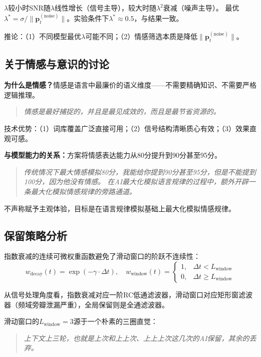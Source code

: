 \documentclass[a4paper, 11pt]{article}
\begin{document}
$\lambda$较小时SNR随$\lambda$线性增长（信号主导），较大时随$\lambda^2$衰减（噪声主导）。
最优$\lambda^* = \sigma / \|\bm{p}_t^{(\text{noise})}\|$。实验条件下$\lambda^* \approx 0.5$，与结果一致。

推论：（1）不同模型最优$\lambda$可能不同；（2）情感筛选本质是降低$\|\bm{p}_t^{(\text{noise})}\|$。

\subsection{关于情感与意识的讨论}

\textbf{为什么是情感？}情感是语言中最廉价的语义维度——不需要精确知识、不需要严格逻辑推理。
\begin{quote}\small\itshape
情感是最好捕捉的，并且是最见成效的，而且是最节省资源的。
\end{quote}
技术优势：（1）词库覆盖广泛直接可用；（2）信号结构清晰质心有效；（3）效果直观可感。

\textbf{与模型能力的关系：}方案将情感表达能力从80分提升到90分甚至95分。
\begin{quote}\small\itshape
传统情况下最大情感模拟80分，我能给你提到90分甚至95分，但是不能提到100分，因为他没有情感。
在AI最大化模拟语言规律的过程中，额外开辟一条最大化模拟情感规律的旁路通道。
\end{quote}
不声称赋予主观体验，目标是在语言规律模拟基础上最大化模拟情感规律。

\subsection{保留策略分析}

指数衰减的连续可微权重函数避免了滑动窗口的阶跃不连续性：
\begin{equation}
  w_{\text{decay}}(t) = \exp(-\gamma \cdot \Delta t),\quad
  w_{\text{window}}(t) = \begin{cases}
    1, & \Delta t < L_{\text{window}} \\
    0, & \Delta t \geq L_{\text{window}}
  \end{cases}
\end{equation}

从信号处理角度看，指数衰减对应一阶RC低通滤波器，滑动窗口对应矩形窗滤波器（频域旁瓣泄漏严重），全局保留则是全通滤波器。

滑动窗口的$L_{\text{window}}=3$源于一个朴素的三圈直觉：
\begin{quote}\small\itshape
上下文上三轮，也就是上次和上上次、上上上次这几次的AI保留，其余的丢弃。
\end{quote}
\end{document}
